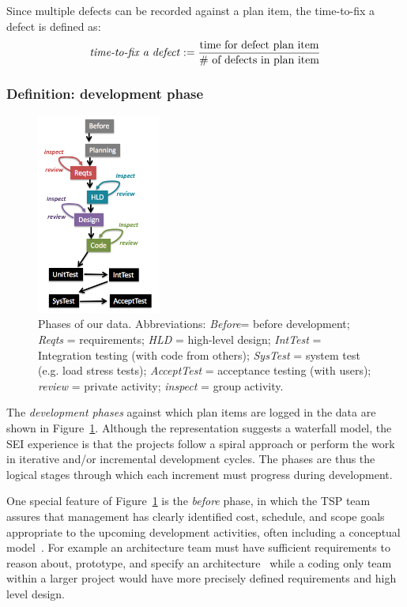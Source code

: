 \documentclass[smallcondensed]{svjour3}
\newcommand{\fig}[1]{Figure~\ref{fig:#1}}
\begin{document}
Since multiple defects can be recorded against a plan item, the time-to-fix a defect is defined as:
\[
\text{\emph{time-to-fix a defect}} := \frac{\text{time for defect plan item}}{\text{\# of defects in plan item}}
\]


\subsubsection{Definition: development phase} \label{development_phase}
\begin{figure}[!b]  
\begin{center}
\includegraphics[width=1.6in]{wfall.png}  
\end{center}
\caption{Phases of our data.
Abbreviations: 
{\em Before}= before development; 
{\em Reqts}	  = requirements; 
{\em HLD}	  = high-level design; 
{\em IntTest} = Integration testing (with code from others); 
{\em SysTest} = system test (e.g. load stress tests); 
{\em AcceptTest}  = acceptance testing (with users); 
{\em review}        = private activity; 
{\em inspect}        = group activity.}
\label{fig:waterfall}
\end{figure}

The \textit{development phases} against which plan items are logged in the data are shown in \fig{waterfall}.
Although the representation suggests a waterfall model, the SEI experience is that the projects follow a spiral approach or perform the work in iterative and/or incremental development cycles. The phases are thus the logical stages through which each increment must progress during development.

One special feature of  \fig{waterfall} is the {\em before} phase, in which the TSP team assures that management has clearly identified cost, schedule, and scope goals appropriate to the upcoming development activities, often including a conceptual model~\cite{Humphrey:2005}. For example an architecture team must have sufficient requirements to reason about, prototype, and specify an architecture~\cite{Bachmann13} while a coding only team within a larger project would have more precisely defined requirements and high level design.
 
\end{document}
